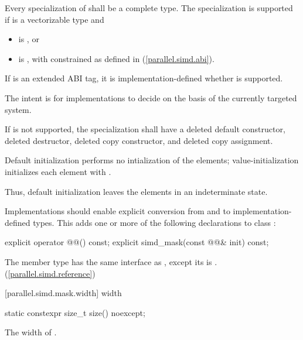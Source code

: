 \pnum
Every specialization of  shall be a complete type. The specialization  is supported if  is a vectorizable type and

\begin{itemize}
  \item {} is , or
  \item {} is , with  constrained as defined in (\ref{parallel.simd.abi}).
\end{itemize}

If  is an extended ABI tag, it is implementation-defined whether  is supported. \begin{note}The intent is for implementations to decide on the basis of the currently targeted system.\end{note}
If  is not supported, the specialization shall have a deleted default constructor, deleted destructor, deleted copy constructor, and deleted copy assignment.

\pnum
Default initialization performs no intialization of the elements; value-initialization initializes each element with . \begin{note}Thus, default initialization leaves the elements in an indeterminate state.\end{note}

\pnum
Implementations should enable explicit conversion from and to implementation-defined types. This adds one or more of the following declarations to class :

\begin{codeblock}
explicit operator @@() const;
explicit simd_mask(const @@& init) const;
\end{codeblock}

\pnum
The member type  has the same interface as , except its  is . (\ref{parallel.simd.reference})

[parallel.simd.mask.width]{ width}

\begin{itemdecl}
static constexpr size_t size() noexcept;
\end{itemdecl}

\begin{itemdescr}
  \pnum\returns
  The width of .
\end{itemdescr}

